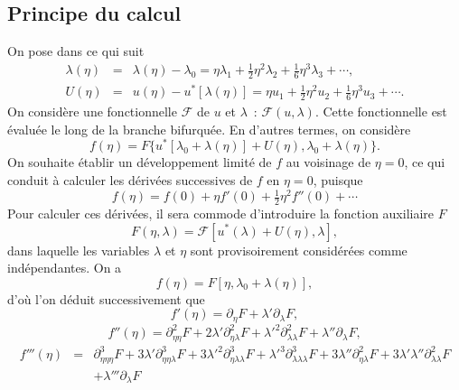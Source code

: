 \documentclass{article}
\begin{document}
\subsection{Principe du calcul}\label{sec20220107121442}

On pose dans ce qui suit
\begin{eqnarray}
  λ (\eta) & = & λ (\eta) - λ_0 = \eta λ_1 +
  \tfrac{1}{2} \eta^2 λ_2 + \tfrac{1}{6} \eta^3 λ_3 + \cdots,
  \label{eq20211112155446}\\
  U (\eta) & = & u (\eta) - u^{\ast} [λ (\eta)] = \eta u_1 +
  \tfrac{1}{2} \eta^2 u_2 + \tfrac{1}{6} \eta^3 u_3 + \cdots .
  \label{eq20211112113028}
\end{eqnarray}
On considère une fonctionnelle $\mathcal{F}$ de $u$ et $λ$~:
$\mathcal{F} (u, λ)$. Cette fonctionnelle est évaluée le long de
la branche bifurquée. En d'autres termes, on considère
\begin{equation}
  f (\eta) = F \{ u^{\ast} [λ_0 + λ (\eta)] + U (\eta), λ_0
  + λ (\eta) \} .
\end{equation}
On souhaite établir un développement limité de $f$ au voisinage de
$\eta = 0$, ce qui conduit à calculer les dérivées successives de
$f$ en $\eta = 0$, puisque
\begin{equation}
  f (\eta) = f (0) + \eta f' (0) + \tfrac{1}{2} \eta^2 f'' (0) + \cdots
\end{equation}
Pour calculer ces dérivées, il sera commode d'introduire la fonction
auxiliaire $F$
\begin{equation}
  F (\eta, λ) =\mathcal{F} [u^{\ast} (λ) + U (\eta), λ],
\end{equation}
dans laquelle les variables $λ$ et $\eta$ sont provisoirement
considérées comme indépendantes. On a
\begin{equation}
  f (\eta) = F [\eta, λ_0 + λ (\eta)],
\end{equation}
d'où l'on déduit successivement que
\begin{equation}
  \label{eq20211112162417} f' (\eta) = \partial_{\eta} F + λ'
  \partial_{λ} F,
\end{equation}
\begin{equation}
  \label{eq20211112165810} f'' (\eta) = \partial_{\eta  \eta}^2 F + 2
  λ' \partial_{\eta  λ}^2 {F + λ'}^2
  \partial_{λ  λ}^2 F + λ'' \partial_{λ} F,
\end{equation}
\begin{eqnarray}
  \label{eq20211112173223} f''' (\eta) & = & \partial_{\eta  \eta
   \eta}^3 F + 3 λ' \partial_{\eta  \eta
  λ}^3 {F + 3 λ'}^2 \partial_{\eta  λ
  λ}^3 {F + λ'}^3 \partial_{λ  λ
  λ}^3 F + 3 λ'' \partial_{\eta  λ}^2 F + 3 λ'
  λ'' \partial_{λ  λ}^2 F \nonumber\\
  &  &  + λ''' \partial_{λ} F
\end{eqnarray}
\end{document}

